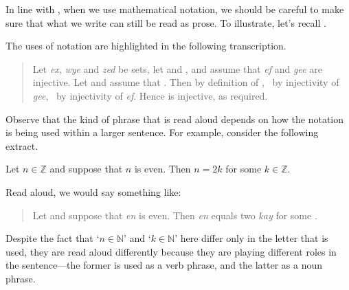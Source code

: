 In line with , when we use mathematical notation, we should be careful to make sure that what we write can still be read as prose. To illustrate, let's recall .

\rxtrInjectiveWithProse*

The uses of notation are highlighted in the following transcription.

\begin{quote}
Let \textit{ex}, \textit{wye} and \textit{zed} be sets, let  and , and assume that \textit{ef} and \textit{gee} are injective. Let  and assume that . Then  by definition of ,  \,  by injectivity of \textit{gee},  \,  by injectivity of \textit{ef}. Hence  is injective, as required.
\end{quote}

Observe that the kind of phrase that is read aloud depends on how the notation is being used within a larger sentence. For example, consider the following extract.

\begin{extract}
Let $n \in \mathbb{Z}$ and suppose that $n$ is even. Then $n=2k$ for some $k \in \mathbb{Z}$.
\end{extract}

Read aloud, we would say something like:
\begin{quote}
Let  and suppose that \textit{en} is even. Then \textit{en} equals two \textit{kay} for some .
\end{quote}
Despite the fact that `$n \in \mathbb{N}$' and `$k \in \mathbb{N}$' here differ only in the letter that is used, they are read aloud differently because they are playing different roles in the sentence---the former is used as a verb phrase, and the latter as a noun phrase.


